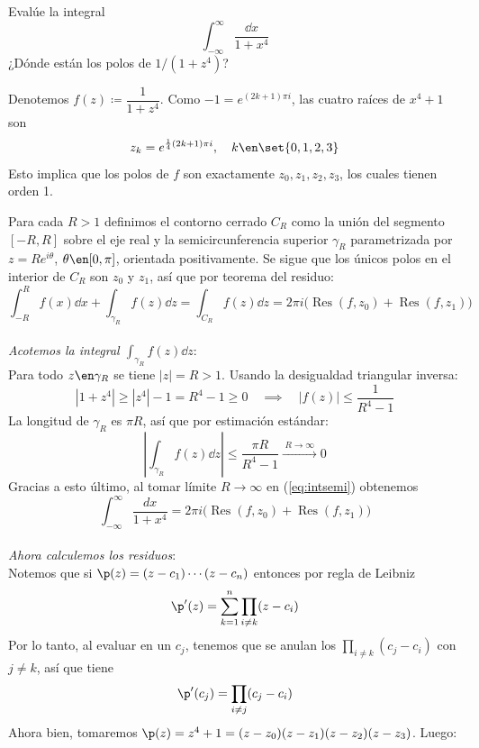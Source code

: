 \setcounter{eje}{1}
\begin{ejer}
Evalúe la integral
\[ \int_{-\infty}^{\infty} \frac{\dd{x}}{1+x^4} \]
¿Dónde están los polos de $1/(1+z^4)$?
\end{ejer}
\begin{sol}
Denotemos $f(z)\coloneq\dfrac{1}{1+z^4}$. Como $-1 = e^{(2k+1)\pi i}$, las cuatro raíces de $x^4+1$ son
\[
z_k = e^{\frac14(2k+1)\pi i},\quad k\en\set{0,1,2,3}
\]  
Esto implica que los polos de $f$ son exactamente $z_0,z_1,z_2,z_3$, los cuales tienen orden 1.\par
Para cada $R>1$ definimos el contorno cerrado $C_R$ como la unión del segmento $[-R,R]$ sobre el eje real y la semicircunferencia superior $\gamma_R$ parametrizada por $z=Re^{i\theta}$, $\theta\en[0,\pi]$, orientada positivamente. Se sigue que los únicos polos en el interior de $C_R$ son $z_0$ y $z_1$, así que por teorema del residuo:
\begin{equation}\label{eq:intsemi}
\int_{-R}^{R} f(x)\dd{x} + \int_{\gamma_R} f(z)\dd{z} 
=\int_{C_R} f(z)\dd{z}
= 2\pi i\bigl(\operatorname{Res}(f,z_0)+\operatorname{Res}(f,z_1)\bigr) 
\end{equation}\\
\emph{Acotemos la integral $\int_{\gamma_R} f(z)\dd{z} $}:\\
Para todo $z\en\gamma_R$ se tiene $|z|=R > 1$. Usando la desigualdad triangular inversa:
\[
|1+z^4| \ge |z^4|-1 = R^4-1 \ge 0%
\quad\implies\quad%
 |f(z)| \le \frac{1}{R^4-1}
\]
La longitud de $\gamma_R$ es $\pi R$, así que por estimación estándar:
\[
\left|\int_{\gamma_R} f(z)\dd{z}\right| \le \frac{\pi R}{R^4-1} \xrightarrow{\;R\to \infty\;} 0
\]
Gracias a esto último, al tomar límite $R\to\infty$ en (\ref{eq:intsemi}) obtenemos
\begin{equation}\label{eq:inte}
\int_{-\infty}^{\infty}\frac{dx}{1+x^4}=2\pi i\bigl(\operatorname{Res}(f,z_0)+\operatorname{Res}(f,z_1)\bigr)
\end{equation}\\
\emph{Ahora calculemos los residuos}:\\
Notemos que si $\p(z) = (z-c_1)\cdots(z-c_n)$ entonces por regla de Leibniz
\[
\p'(z)=\sum^n_{k=1}\prod_{i\neq k}(z-c_i)
\]
Por lo tanto, al evaluar en un $c_j$, tenemos que se anulan los $\prod_{i\neq k}(c_j-c_i)$ con $j\neq k$, así que tiene 
\begin{equation}\label{eq:proddif}
\p'(c_j) = \prod_{i\neq j}(c_j-c_i)
\end{equation}
Ahora bien, tomaremos $\p(z) = z^4+1 = (z-z_0)(z-z_1)(z-z_2)(z-z_3)$. Luego:

\end{sol}
